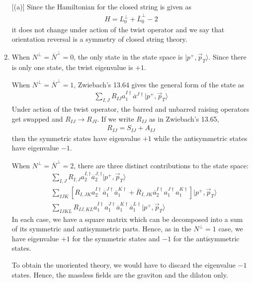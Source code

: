 \documentclass[11pt]{article}
\begin{document}
\begin{enumerate} [(a)]
    Since the Hamiltonian for the closed string is given as 
    \begin{align*}
        H = L_0^\perp + \overline{L}_0^\perp - 2
    \end{align*}
    it does not change under action of the twist operator and we say that orientation reversal is a symmetry of closed string theory. 

    \item When $N^\perp = \overline{N}^\perp = 0$, the only state in the state space is $| p^+, \vec{p}_T \rangle$. Since there is only one state, the twist eigenvalue is $+1$. 
    
    When $N^\perp = \overline{N}^\perp = 1$, Zwiebach's 13.64 gives the general form of the state as 
    \begin{align*}
        \sum_{I,J} R_{IJ} a^{I\dagger}_1 \overline{a}^{J\dagger} |p^+, \vec{p}_T \rangle 
    \end{align*}
    Under action of the twist operator, the barred and unbarred raising operators get swapped and $R_{IJ} \to R_{JI}$. If we write $R_{IJ}$ as in Zwiebach's 13.65, 
    \begin{align*}
        R_{IJ} = S_{IJ} + A_{IJ}
    \end{align*}
    then the symmetric states have eigenvalue $+1$ while the antisymmetric states have eigenvalue $-1$. 

    When $N^\perp = \overline{N}^\perp = 2$, there are three distinct contributions to the state space: 
    \begin{align*}
        &\sum_{I,J} R_{I,J} a_2^{I, \dagger} \overline{a}_2^{J, \dagger} |p^+, \vec{p}_T \rangle \\
        &\sum_{IJK} \left[R_{I,JK}a_2^{I \dagger} \overline{a}_1^{J \dagger}\overline{a}_1^{K \dagger} + \overline{R}_{I, JK}\overline{a}_2^{I \dagger} {a}_1^{J \dagger} {a}_1^{K \dagger} \right] |p^+, \vec{p}_T \rangle  \\
        &\sum_{IJKL} R_{IJ, KL}a_1^{I\dagger}a_1^{J\dagger}\overline{a}_1^{K\dagger} \overline{a}_1^{L\dagger} |p^+, \vec{p}_T \rangle
    \end{align*}
    In each case, we have a square matrix which can be decomposed into a sum of its symmetric and antisymmetric parts. Hence, as in the $N^\perp = 1$ case, we have eigenvalue $+1$ for the symmetric states and $-1$ for the antisymmetric states. 

    To obtain the unoriented theory, we would have to discard the eigenvalue $-1$ states. Hence, the massless fields are the graviton and the dilaton only. 
\end{enumerate}
\end{document}
